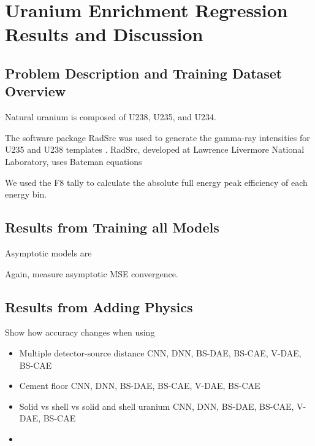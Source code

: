 \chapter{Uranium Enrichment Regression Results and Discussion}

\section{Problem Description and Training Dataset Overview}

Natural uranium is composed of U238, U235, and U234. 


The software package RadSrc was used to generate the gamma-ray intensities for U235 and U238 templates \cite{Hiller2007}. RadSrc, developed at Lawrence Livermore National Laboratory, uses Bateman equations 

We used the F8 tally to calculate the absolute full
energy peak efficiency of each energy bin.



\section{Results from Training all Models}


Asymptotic models are 


Again, measure asymptotic MSE convergence.



\section{Results from Adding Physics}

Show how accuracy changes when using
\begin{itemize}
    \item Multiple detector-source distance
    \subitem CNN, DNN, BS-DAE, BS-CAE, V-DAE, BS-CAE
    \item Cement floor
    \subitem CNN, DNN, BS-DAE, BS-CAE, V-DAE, BS-CAE
    \item Solid vs shell vs solid and shell uranium
    \subitem CNN, DNN, BS-DAE, BS-CAE, V-DAE, BS-CAE
    \item 
\end{itemize}







